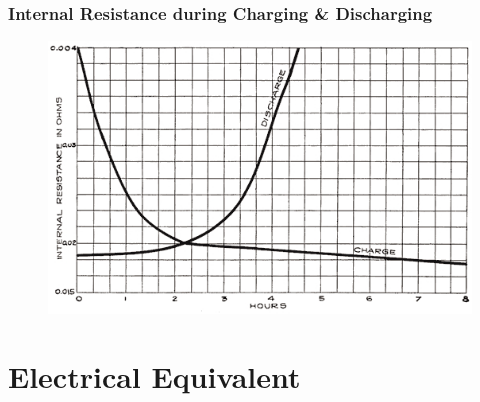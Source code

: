 \documentclass{beamer}
\begin{document}
\begin{frame}     %
  \frametitle{Internal Resistance during Charging \& Discharging}
  
  \begin{figure}
    \includegraphics[width=0.8\linewidth]{./Resources/Images/internalresistance_charge_discharge.jpg}
  \end{figure}
\end{frame}


\section{Electrical Equivalent}
\end{document}
